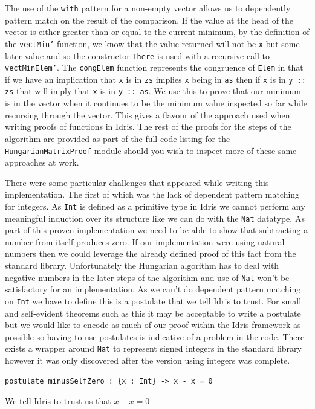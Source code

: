 \documentclass[a4paper, notitlepage]{report}
\begin{document}
The use of the \texttt{with} pattern for a non-empty vector allows us to dependently
pattern match on the result of the comparison. If the value at the head of the
vector is either greater than or equal to the current minimum, by the definition
of the \texttt{vectMin'} function, we know that the value returned will not be \texttt{x} but some
later value and so the constructor \texttt{There} is used with a recursive call to
\texttt{vectMinElem'}. The \texttt{congElem} function represents the congruence of \texttt{Elem} in that if
we have an implication that \texttt{x} is in \texttt{zs} implies \texttt{x} being in \texttt{as} then if \texttt{x} is in \texttt{y
:: zs} that will imply that \texttt{x} is in \texttt{y :: as}. We use this to prove that our
minimum is in the vector when it continues to be the minimum value inspected so
far while recursing through the vector. This gives a flavour of the approach
used when writing proofs of functions in Idris. The rest of the proofs for the
steps of the algorithm are provided as part of the full code listing for the
\texttt{HungarianMatrixProof} module should you wish to inspect more of these same
approaches at work.

There were some particular challenges that appeared while writing this
implementation. The first of which was the lack of dependent pattern matching
for integers. As \texttt{Int} is defined as a primitive type in Idris we cannot perform
any meaningful induction over its structure like we can do with the \texttt{Nat}
datatype. As part of this proven implementation we need to be able to show that
subtracting a number from itself produces zero. If our implementation were using
natural numbers then we could leverage the already defined proof of this fact
from the standard library. Unfortunately the Hungarian algorithm has to deal
with negative numbers in the later steps of the algorithm and use of \texttt{Nat} won't
be satisfactory for an implementation. As we can't do dependent pattern matching
on \texttt{Int} we have to define this is a postulate that we tell Idris to trust. For
small and self-evident theorems such as this it may be acceptable to write a
postulate but we would like to encode as much of our proof within the Idris
framework as possible so having to use postulates is indicative of a problem in
the code. There exists a wrapper around \texttt{Nat} to represent signed integers in the
standard library however it was only discovered after the version using integers
was complete.

\begin{listing}[H]
\begin{verbatim}
postulate minusSelfZero : {x : Int} -> x - x = 0
\end{verbatim}
\caption{We tell Idris to trust us that \(x\mathbin{-} x \mathrel{=} 0\)}
\end{listing}
\end{document}
